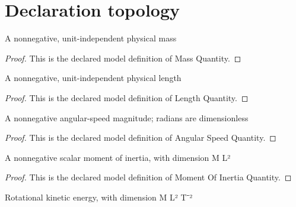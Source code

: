 \section{Declaration topology}
\begin{definition}
  \label{def:physics:phyx-mini-0819:phyxminiproblems-problemphyxmini0819-massquantity}
  A nonnegative, unit-independent physical mass
\end{definition}
\begin{proof}
  This is the declared model definition of Mass Quantity.
\end{proof}
\begin{definition}
  \label{def:physics:phyx-mini-0819:phyxminiproblems-problemphyxmini0819-lengthquantity}
  A nonnegative, unit-independent physical length
\end{definition}
\begin{proof}
  This is the declared model definition of Length Quantity.
\end{proof}
\begin{definition}
  \label{def:physics:phyx-mini-0819:phyxminiproblems-problemphyxmini0819-angularspeedquantity}
  A nonnegative angular-speed magnitude; radians are dimensionless
\end{definition}
\begin{proof}
  This is the declared model definition of Angular Speed Quantity.
\end{proof}
\begin{definition}
  \label{def:physics:phyx-mini-0819:phyxminiproblems-problemphyxmini0819-momentofinertiaquantity}
  A nonnegative scalar moment of inertia, with dimension M L²
\end{definition}
\begin{proof}
  This is the declared model definition of Moment Of Inertia Quantity.
\end{proof}
\begin{definition}
  \label{def:physics:phyx-mini-0819:phyxminiproblems-problemphyxmini0819-energyquantity}
  Rotational kinetic energy, with dimension M L² T⁻²
\end{definition}
